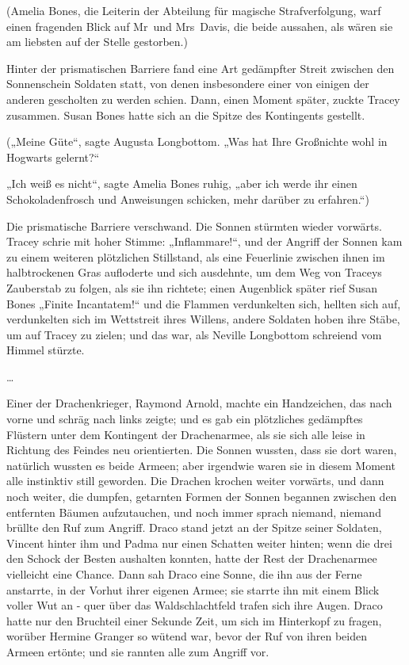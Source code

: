 {(Amelia Bones, die Leiterin der Abteilung für magische Strafverfolgung, warf einen fragenden Blick auf Mr~und Mrs~Davis, die beide aussahen, als wären sie am liebsten auf der Stelle gestorben.)

Hinter der prismatischen Barriere fand eine Art gedämpfter Streit zwischen den Sonnenschein Soldaten statt, von denen insbesondere einer von einigen der anderen gescholten zu werden schien. Dann, einen Moment später, zuckte Tracey zusammen. Susan Bones hatte sich an die Spitze des Kontingents gestellt.

(„Meine Güte“, sagte Augusta Longbottom. „Was hat Ihre Großnichte wohl in Hogwarts gelernt?“

„Ich weiß es nicht“, sagte Amelia Bones ruhig, „aber ich werde ihr einen Schokoladenfrosch und Anweisungen schicken, mehr darüber zu erfahren.“)

Die prismatische Barriere verschwand. Die Sonnen stürmten wieder vorwärts. Tracey schrie mit hoher Stimme: „Inflammare!“, und der Angriff der Sonnen kam zu einem weiteren plötzlichen Stillstand, als eine Feuerlinie zwischen ihnen im halbtrockenen Gras aufloderte und sich ausdehnte, um dem Weg von Traceys Zauberstab zu folgen, als sie ihn richtete; einen Augenblick später rief Susan Bones „Finite Incantatem!“ und die Flammen verdunkelten sich, hellten sich auf, verdunkelten sich im Wettstreit ihres Willens, andere Soldaten hoben ihre Stäbe, um auf Tracey zu zielen; und das war, als Neville Longbottom schreiend vom Himmel stürzte.

…

Einer der Drachenkrieger, Raymond Arnold, machte ein Handzeichen, das nach vorne und schräg nach links zeigte; und es gab ein plötzliches gedämpftes Flüstern unter dem Kontingent der Drachenarmee, als sie sich alle leise in Richtung des Feindes neu orientierten. Die Sonnen wussten, dass sie dort waren, natürlich wussten es beide Armeen; aber irgendwie waren sie in diesem Moment alle instinktiv still geworden. Die Drachen krochen weiter vorwärts, und dann noch weiter, die dumpfen, getarnten Formen der Sonnen begannen zwischen den entfernten Bäumen aufzutauchen, und noch immer sprach niemand, niemand brüllte den Ruf zum Angriff. Draco stand jetzt an der Spitze seiner Soldaten, Vincent hinter ihm und Padma nur einen Schatten weiter hinten; wenn die drei den Schock der Besten aushalten konnten, hatte der Rest der Drachenarmee vielleicht eine Chance. Dann sah Draco eine Sonne, die ihn aus der Ferne anstarrte, in der Vorhut ihrer eigenen Armee; sie starrte ihn mit einem Blick voller Wut an - quer über das Waldschlachtfeld trafen sich ihre Augen. Draco hatte nur den Bruchteil einer Sekunde Zeit, um sich im Hinterkopf zu fragen, worüber Hermine Granger so wütend war, bevor der Ruf von ihren beiden Armeen ertönte; und sie rannten alle zum Angriff vor.

}
